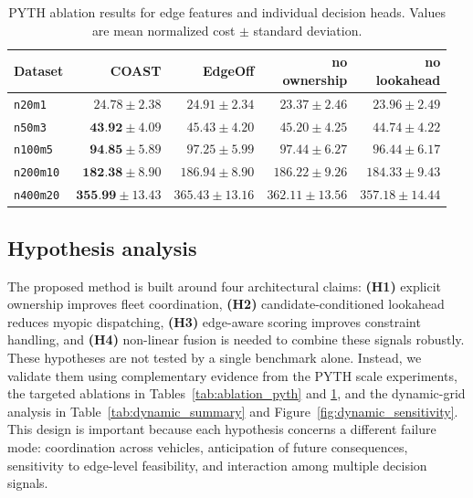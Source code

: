 \documentclass[letterpaper]{article}
\begin{document}
\begin{table}[t]
\centering
{\small
\setlength{\tabcolsep}{2pt}
\begin{tabular}{lrrrr}
\toprule
Dataset & COAST & EdgeOff & \shortstack{no\\ownership} & \shortstack{no\\lookahead} \\
\midrule
\texttt{n20m1} & $24.78\pm2.38$ & $24.91\pm2.34$ & $23.37\pm2.46$ & $23.96\pm2.49$ \\
\texttt{n50m3} & $\textbf{43.92}\pm4.09$ & $45.43\pm4.20$ & $45.20\pm4.25$ & $44.74\pm4.22$ \\
\texttt{n100m5} & $\textbf{94.85}\pm5.89$ & $97.25\pm5.99$ & $97.44\pm6.27$ & $96.44\pm6.17$ \\
\texttt{n200m10} & $\textbf{182.38}\pm8.90$ & $186.94\pm8.90$ & $186.22\pm9.26$ & $184.33\pm9.43$ \\
\texttt{n400m20} & $\textbf{355.99}\pm13.43$ & $365.43\pm13.16$ & $362.11\pm13.56$ & $357.18\pm14.44$ \\
\bottomrule
\end{tabular}
}
\caption{PYTH ablation results for edge features and individual decision heads. Values are mean normalized cost $\pm$ standard deviation.}
\label{tab:ablation_modules}
\end{table}

\subsection{Hypothesis analysis}

The proposed method is built around four architectural claims: \textbf{(H1)} explicit ownership improves fleet coordination, \textbf{(H2)} candidate-conditioned lookahead reduces myopic dispatching, \textbf{(H3)} edge-aware scoring improves constraint handling, and \textbf{(H4)} non-linear fusion is needed to combine these signals robustly. These hypotheses are not tested by a single benchmark alone. Instead, we validate them using complementary evidence from the PYTH scale experiments, the targeted ablations in Tables~\ref{tab:ablation_pyth} and \ref{tab:ablation_modules}, and the dynamic-grid analysis in Table~\ref{tab:dynamic_summary} and Figure~\ref{fig:dynamic_sensitivity}. This design is important because each hypothesis concerns a different failure mode: coordination across vehicles, anticipation of future consequences, sensitivity to edge-level feasibility, and interaction among multiple decision signals.
\end{document}
